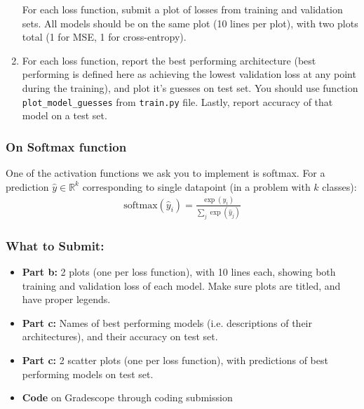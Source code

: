 \documentclass{article}
\begin{document}
\begin{aprob}
\begin{enumerate}
\begin{itemize}
        \end{itemize}
        For each loss function, submit a plot of losses from training and validation sets. All models should be on the same plot (10 lines per plot), with two plots total (1 for MSE, 1 for cross-entropy).
        \item {} For each loss function, report the best performing architecture (best performing is defined here as achieving the lowest validation loss at any point during the training), and plot it's guesses on test set. You should use function \texttt{plot\_model\_guesses} from \texttt{train.py} file. Lastly, report accuracy of that model on a test set.
    \end{enumerate}
    
    \subsubsection*{On Softmax function}
    One of the activation functions we ask you to implement is softmax. For a prediction $\hat{y} \in \mathbb{R}^k$ corresponding to single datapoint (in a problem with $k$ classes):
    \begin{align*}
        \text{softmax}(\hat{y}_i) = \frac{\exp(\hat{y}_i)}{\sum_j \exp(\hat{y}_j)}
    \end{align*}
    
    \subsubsection*{What to Submit:}
    \begin{itemize}
        \item \textbf{Part b:} 2 plots (one per loss function), with 10 lines each, showing both training and validation loss of each model. Make sure plots are titled, and have proper legends.
        \item \textbf{Part c:} Names of best performing models (i.e. descriptions of their architectures), and their accuracy on test set.
        \item \textbf{Part c:} 2 scatter plots (one per loss function), with predictions of best performing models on test set.
        \item \textbf{Code} on Gradescope through coding submission
    \end{itemize}
\end{aprob}
\fi
\end{document}
